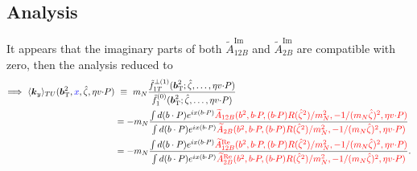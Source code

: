 \documentclass[]{article}
\numberwithin{equation}{section}
\newcommand{\tcdot}{{\cdot}}
\newcommand{\vect}[1]{\ensuremath{\boldsymbol{#1}}}
\newcommand{\vprp}[1]{\vect{#1}_{\mathrm T}}
\newcommand{\tAmp}{\widetilde{A}}
\newcommand{\tAmp}{\ensuremath{\widetilde{A}^{(+)}}}
\newcommand{\bvec}{b}
\newcommand{\mN}{m_N}
\newcommand{\zetahat}{{\hat \zeta}}
\begin{document}
\subsection{Analysis}
It appears that the imaginary parts of both $\tAmp^{\text{Im}}_{12B}$ and $\tAmp^{\text{Im}}_{2B}$ are compatible with zero, then the analysis reduced to 
\begin{align}
   \Longrightarrow~ \langle \vect{k}_y \rangle_{TU}(\vprp{\bvec}^2,\textcolor{blue}{x},\zetahat,\eta v \tcdot P) 
	&\ \equiv\ \mN \frac{\tilde f_{1T}^{\perp(1)}(\vprp{\bvec}^2;\zetahat,\ldots,\eta v \tcdot P)}{\tilde f_1^{(0)}(\vprp{\bvec}^2;\zetahat,\ldots,\eta v \tcdot P)}\\
 &=-m_{N} \frac{\int d(b\cdot P)e^{ix(b\cdot P)} \textcolor{red}{\tAmp_{12B}(\bvec^2,\bvec \tcdot P,(\bvec \tcdot P) R(\zetahat^2)/\mN^2,-1/(\mN\zetahat)^2,\eta v \tcdot P)}}{\int d(b\cdot P)e^{ix(b\cdot P)}\textcolor{red}{\tAmp_{2B}(\bvec^2,\bvec \tcdot P,(\bvec \tcdot P) R(\zetahat^2)/\mN^2,-1/(\mN\zetahat)^2,\eta v \tcdot P)}}\\
 &=-m_{N} \frac{\int d(b\cdot P)e^{ix(b\cdot P)} \textcolor{red}{\tAmp_{12B}^{\text{Re}}(\bvec^2,\bvec \tcdot P,(\bvec \tcdot P) R(\zetahat^2)/\mN^2,-1/(\mN\zetahat)^2,\eta v \tcdot P)}}{\int d(b\cdot P)e^{ix(b\cdot P)}\textcolor{red}{\tAmp_{2B}^{\text{Re}}(\bvec^2,\bvec \tcdot P,(\bvec \tcdot P) R(\zetahat^2)/\mN^2,-1/(\mN\zetahat)^2,\eta v \tcdot P)}}.
\end{align}
\end{document}
